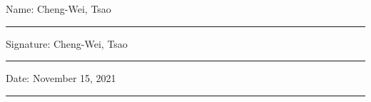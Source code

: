 \documentclass[11pt,oneside]{book}
\begin{document}
\noindent Name: Cheng-Wei, Tsao\\[1mm]
\rule[1em]{25em}{0.5pt}

\noindent Signature: Cheng-Wei, Tsao\\[1mm]
\rule[1em]{25em}{0.5pt}

\noindent Date: November 15, 2021\\[1mm]
\rule[1em]{25em}{0.5pt}





\tableofcontents
\listoffigures
\listoftables


\mainmatter







 
 
\end{document}

